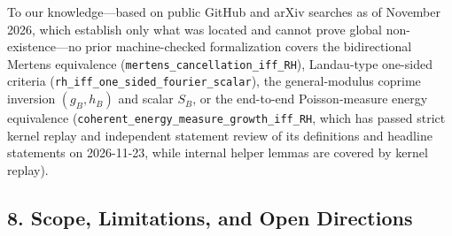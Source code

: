 \documentclass[11pt]{article}
\begin{document}
To our knowledge---based on public GitHub and arXiv searches as of November 2026, which establish only what was located and cannot prove global non-existence---no prior machine-checked formalization covers the bidirectional Mertens equivalence (\texttt{mertens\_cancellation\_iff\_RH}), Landau-type one-sided criteria (\texttt{rh\_iff\_one\_sided\_fourier\_scalar}), the general-modulus coprime inversion \((g_B, h_B)\) and scalar \(S_B\), or the end-to-end Poisson-measure energy equivalence (\texttt{coherent\_energy\_measure\_growth\_iff\_RH}, which has passed strict kernel replay and independent statement review of its definitions and headline statements on 2026-11-23, while internal helper lemmas are covered by kernel replay).

\subsection{8. Scope, Limitations, and Open Directions}\label{8-scope-limitations-and-open-directions}
\end{document}
